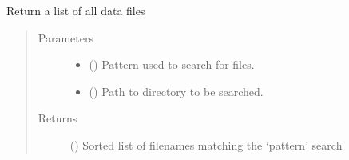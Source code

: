 \documentclass[a4paper,10pt,english]{sphinxmanual}
\begin{document}

\begin{fulllineitems}
\label{\detokenize{cascade.utilities:cascade.utilities.utilities.find}}
Return  a list of all data files
\begin{quote}\begin{description}
\item[{Parameters}] \leavevmode\begin{itemize}
\item {} 
 () \textendash{} Pattern used to search for files.

\item {} 
 () \textendash{} Path to directory to be searched.

\end{itemize}

\item[{Returns}] \leavevmode
{} () \textendash{} Sorted list of filenames matching the ‘pattern’ search

\end{description}\end{quote}

\end{fulllineitems}

\end{document}
